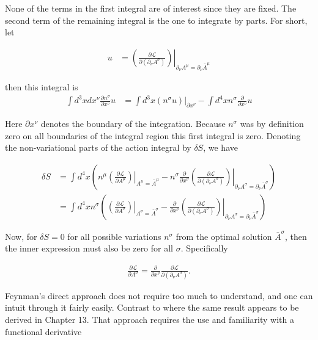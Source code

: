 \documentclass{article}
\newcommand{\LL}[0]{\mathcal{L}}
\newcommand{\PD}[2]{\frac{\partial {#2}}{\partial {#1}}}
\newcommand{\barA}[0]{\bar{A}}
\begin{document}
None of the terms in the first integral are of interest since they are fixed.  The second term of the remaining integral is the one to integrate by
parts.  For short, let

\begin{align*}
u &= \left. \left( \PD{(\partial_\nu A^\sigma)}{\LL} \right) \right\vert_{\partial_\nu A^\mu = \partial_\nu \barA^\mu}
\end{align*}

then this integral is
\begin{align*}
\int d^3 x d x^\nu \PD{x^\nu}{n^\sigma} u 
&= \int d^3 x \left. \left( {n^\sigma} u \right) \right\vert_{\partial x^\nu} - \int d^4 x n^\sigma \PD{x^\nu}{} u
\end{align*}

Here $\partial x^\nu$ denotes the boundary of the integration.  Because $n^\sigma$ was by definition zero on all boundaries of the
integral region this first integral is zero.  Denoting the non-variational parts of the action integral by $\delta S$, we have

\begin{align*}
\delta S
&= \int d^4 x \left(
n^\mu \left. \left( \PD{A^\mu}{\LL} \right) \right\vert_{A^\mu = \barA^\mu} 
- n^\sigma \PD{x^\nu}{} \left. \left( \PD{(\partial_\nu A^\sigma)}{\LL} \right) \right\vert_{\partial_\nu A^\sigma = \partial_\nu \barA^\sigma}
\right) \\
&= \int d^4 x
n^\sigma
\left(
\left. \left( \PD{A^\sigma}{\LL} \right) \right\vert_{A^\sigma = \barA^\sigma} 
- \PD{x^\nu}{} \left. \left( \PD{(\partial_\nu A^\sigma)}{\LL} \right) \right\vert_{\partial_\nu A^\sigma = \partial_\nu \barA^\sigma}
\right)
\end{align*}

Now, for $\delta S = 0$ for all possible variations $n^\sigma$ from the optimal solution $\barA^\sigma$, then the inner expression must also be zero
for all $\sigma$.  Specifically

\begin{align}\label{eqn:eulerLagrangeField}
\PD{A^\sigma}{\LL} = \PD{x^\nu}{} \PD{(\partial_\nu A^\sigma)}{\LL}.
\end{align}

Feynman's direct approach does not require too much to understand, and one can intuit through it fairly easily.  Contrast to 
\cite{goldstein1951cm}
where the same result appears to be derived in Chapter 13.  That approach requires the use and familiarity with a functional derivative
\end{document}
